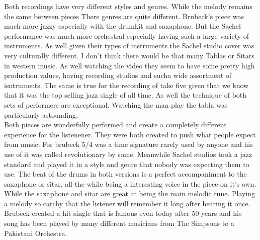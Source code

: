 \documentclass{article}
\begin{document}
Both recordings have very different styles and genres. While the melody remains
the same between pieces There genres are quite different. Brubeck's piece was
much more jazzy especially with the drumkit and saxaphone. But the Sachel
performance was much more orchestral especially having such a large variety of
instruments. As well given their types of instruments the Sachel studio cover
was very culturally different. I don't think there would be that many Tablas or
Sitars in western music. As well watching the video they seem to have some
pretty high production values, having recording studios and sucha wide
assortment of isntruments. The same is true for the recording of take five given
that we know that it was the top selling jazz single of all time. As well the
technique of both sets of performers are exceptional. Watching the man play the
tabla was particularly astounding.\\

Both pieces are wonderfully performed and create a completely different
experience for the listenener. They were both created to push what people expect
from music. For brubeck 5/4 was a time signature rarely used by anyone and his
use of it was called revolutionary by some. Meanwhile Sachel studios took a jazz
standard and played it in a style and genre that nobody was expecting them to
use. The beat of the drums in both versions is a perfect accompaniment to the
saxaphone or sitar, all the while being a interesting voice in the piece on it's
own. While the saxaphone and sitar are great at being the main melodic tune.
Playing a melody so catchy that the listener will remember it long after hearing
it once. Brubeck created a hit single that is famous even today after 50 years 
and his song has been played by many different musicians from The Simpsons to a
Pakistani Orchestra.\\
\end{document}
